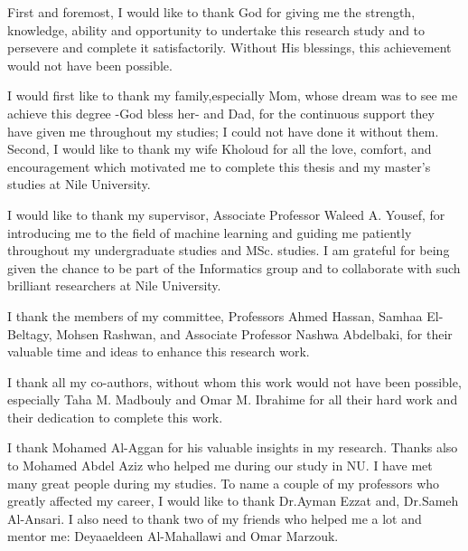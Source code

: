 


\newpage
{}

First and foremost, I would like to thank God for giving me the strength, knowledge, ability and opportunity to undertake this research study and to persevere and complete it satisfactorily. Without His blessings, this achievement would not have been possible. 

I would first like to thank my family,especially Mom, whose dream was to see me achieve this degree -God bless her- and Dad, for the continuous support they have given me throughout my studies; I could not have done it without them. Second, I would like to thank my wife Kholoud for all the love, comfort, and encouragement which motivated me to complete this thesis and my master’s studies at Nile University. 

I would like to thank my supervisor, Associate Professor Waleed A. Yousef, for introducing me to the field of machine learning and guiding me patiently throughout my undergraduate studies and MSc. studies. I am grateful for being given the chance to be part of the Informatics group and to collaborate with such brilliant researchers at Nile University.

I thank the members of my committee, Professors Ahmed Hassan, Samhaa El-Beltagy, Mohsen Rashwan, and Associate Professor Nashwa Abdelbaki, for their valuable time and ideas to enhance this research work. 

I thank all my co-authors, without whom this work would not have been possible, especially Taha M. Madbouly and Omar M. Ibrahime for all their hard work and their dedication to complete this work. 

I thank Mohamed Al-Aggan for his valuable insights in my research. Thanks also to Mohamed Abdel Aziz who helped me during our study in NU. I have met many great people during my studies. To name a couple of my professors who greatly affected my career, I would like to thank Dr.Ayman Ezzat and, Dr.Sameh Al-Ansari. I also need to thank two of my friends who helped me a lot and mentor me: Deyaaeldeen Al-Mahallawi and Omar Marzouk.


